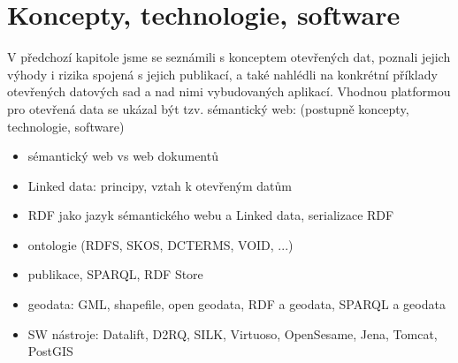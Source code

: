 
\chapter{Koncepty, technologie, software}

V předchozí kapitole jsme se seznámili s konceptem otevřených dat, poznali jejich výhody i rizika spojená s jejich publikací, a také nahlédli na konkrétní příklady otevřených datových sad a nad nimi vybudovaných aplikací.
Vhodnou platformou pro otevřená data se ukázal být tzv. sémantický web: (postupně koncepty, technologie, software)
\begin{itemize}
	\item sémantický web vs web dokumentů
	\item Linked data: principy, vztah k otevřeným datům
	\item RDF jako jazyk sémantického webu a Linked data, serializace RDF
	\item ontologie (RDFS, SKOS, DCTERMS, VOID, ...)
	\item publikace, SPARQL, RDF Store
	\item geodata: GML, shapefile, open geodata, RDF a geodata, SPARQL a geodata
	\item SW nástroje: Datalift, D2RQ, SILK, Virtuoso, OpenSesame, Jena, Tomcat, PostGIS
\end{itemize}
